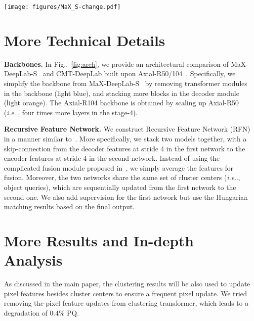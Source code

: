 \documentclass[10pt,twocolumn,letterpaper]{article}
\makeatletter
\DeclareRobustCommand\onedot{\futurelet\@let@token\@onedot}
\def\@onedot{\ifx\@let@token.\else.\null\fi\xspace}
\def\ie{\emph{i.e}\onedot} \def\Ie{\emph{I.e}\onedot}
\newcommand{\figref}[1]{Fig\onedot~\ref{#1}}
\makeatother
\begin{document}
\begin{figure*}[th]
    \centering
    \texttt{[image: figures/MaX\_S-change.pdf]}
    \caption{A visual comparison of architecture between MaX-DeepLab-S and CMT-DeepLab. Pretrained backbone part is labeled in blue color.
    }
    \label{fig:arch}
\end{figure*}

\section{More Technical Details}
\noindent\textbf{Backbones.} In \figref{fig:arch}, we provide an architectural comparison of MaX-DeepLab-S~\cite{wang2021max} and CMT-DeepLab built upon Axial-R50/104~\cite{wang2020axial}. Specifically, we simplify the backbone from MaX-DeepLab-S~\cite{wang2021max} by removing transformer modules in the backbone (light blue), and stacking more blocks in the decoder module (light orange). The Axial-R104 backbone is obtained by scaling up Axial-R50 (\ie, four times more layers in the stage-4).

\vspace{0.5ex}
\noindent\textbf{Recursive Feature Network.} We construct Recursive Feature Network (RFN) in a manner similar to~\cite{qiao2020detectors}. More specifically, we stack two models together, with a skip-connection from the decoder features at stride 4 in the first network to the encoder features at stride 4 in the second network. Instead of using the complicated fusion module proposed in~\cite{qiao2020detectors}, we simply average the features for fusion. Moreover, the two networks share the same set of cluster centers (\ie, object queries), which are sequentially updated from the first network to the second one. We also add supervision for the first network but use the Hungarian matching results based on the final output. 

\section{More Results and In-depth Analysis}
As discussed in the main paper, the clustering results will be also used to update pixel features besides cluster centers to ensure a frequent pixel update. We tried removing the pixel feature updates from clustering transformer, which leads to a degradation of 0.4\% PQ.
\end{document}
